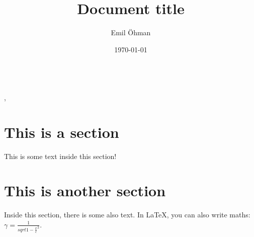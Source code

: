 \documentclass[a4paper]{article}
\title{Document title}
\author{Emil Öhman}
\date{\today}
\begin{document}
\makeatletter
\noindent\huge{\textbf{\@title}}\vspace{0.33em}\\
\Large{\@author, \@date}\normalsize
\makeatother

\tableofcontents

\section{This is a section}
This is some text inside this section!

\section{This is another section}
Inside this section, there is some also text. In \LaTeX, you can also write maths: \(\gamma=\frac{1}{sqrt{1-{\frac{v}{c}}^2}}\).
\end{document}
